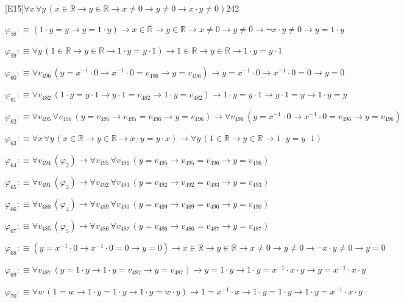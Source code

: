 \begin{fullproof}{[E15]}{$\forall x\,\forall y\,(x \in \mathbb{R} \to y \in \mathbb{R} \to x \neq 0 \to y \neq 0 \to x \cdot y \neq 0)$}{242}
\begin{abbrevlist}
\item $\varphi_{58} :\equiv (1 \cdot y = y \to y = 1 \cdot y) \to x \in \mathbb{R} \to y \in \mathbb{R} \to x \neq 0 \to y \neq 0 \to \neg x \cdot y \neq 0 \to y = 1 \cdot y$
\item $\varphi_{59} :\equiv \forall y\,(1 \in \mathbb{R} \to y \in \mathbb{R} \to 1 \cdot y = y \cdot 1) \to 1 \in \mathbb{R} \to y \in \mathbb{R} \to 1 \cdot y = y \cdot 1$
\item $\varphi_{60} :\equiv \forall v_{496}\,(y = x^{-1} \cdot 0 \to x^{-1} \cdot 0 = v_{496} \to y = v_{496}) \to y = x^{-1} \cdot 0 \to x^{-1} \cdot 0 = 0 \to y = 0$
\item $\varphi_{61} :\equiv \forall v_{482}\,(1 \cdot y = y \cdot 1 \to y \cdot 1 = v_{482} \to 1 \cdot y = v_{482}) \to 1 \cdot y = y \cdot 1 \to y \cdot 1 = y \to 1 \cdot y = y$
\item $\varphi_{62} :\equiv \forall v_{495}\,\forall v_{496}\,(y = v_{495} \to v_{495} = v_{496} \to y = v_{496}) \to \forall v_{496}\,(y = x^{-1} \cdot 0 \to x^{-1} \cdot 0 = v_{496} \to y = v_{496})$
\item $\varphi_{63} :\equiv \forall x\,\forall y\,(x \in \mathbb{R} \to y \in \mathbb{R} \to x \cdot y = y \cdot x) \to \forall y\,(1 \in \mathbb{R} \to y \in \mathbb{R} \to 1 \cdot y = y \cdot 1)$
\item $\varphi_{64} :\equiv \forall v_{494}\,(\varphi_{2}) \to \forall v_{495}\,\forall v_{496}\,(y = v_{495} \to v_{495} = v_{496} \to y = v_{496})$
\item $\varphi_{65} :\equiv \forall v_{491}\,(\varphi_{3}) \to \forall v_{492}\,\forall v_{493}\,(y = v_{492} \to v_{492} = v_{493} \to y = v_{493})$
\item $\varphi_{66} :\equiv \forall v_{488}\,(\varphi_{4}) \to \forall v_{489}\,\forall v_{490}\,(y = v_{489} \to v_{489} = v_{490} \to y = v_{490})$
\item $\varphi_{67} :\equiv \forall v_{485}\,(\varphi_{5}) \to \forall v_{486}\,\forall v_{487}\,(y = v_{486} \to v_{486} = v_{487} \to y = v_{487})$
\item $\varphi_{68} :\equiv (y = x^{-1} \cdot 0 \to x^{-1} \cdot 0 = 0 \to y = 0) \to x \in \mathbb{R} \to y \in \mathbb{R} \to x \neq 0 \to y \neq 0 \to \neg x \cdot y \neq 0 \to y = 0$
\item $\varphi_{69} :\equiv \forall v_{487}\,(y = 1 \cdot y \to 1 \cdot y = v_{487} \to y = v_{487}) \to y = 1 \cdot y \to 1 \cdot y = x^{-1} \cdot x \cdot y \to y = x^{-1} \cdot x \cdot y$
\item $\varphi_{70} :\equiv \forall w\,(1 = w \to 1 \cdot y = 1 \cdot y \to 1 \cdot y = w \cdot y) \to 1 = x^{-1} \cdot x \to 1 \cdot y = 1 \cdot y \to 1 \cdot y = x^{-1} \cdot x \cdot y$

\end{abbrevlist}
\end{fullproof}
